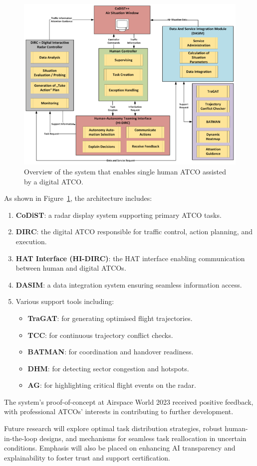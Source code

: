 \begin{figure}[!ht]
    \centering
    \includegraphics[width=.7\textwidth]{img/digital-atco.png}
    \caption{Overview of the system that enables single human ATCO assisted by a digital ATCO. \cite{Jameel_2023}}
    \label{digital-atco}
\end{figure}

As shown in Figure~\ref{digital-atco}, the architecture includes:
\begin{enumerate}
    \item \textbf{\gls{CoDiST}}: a radar display system supporting primary \gls{ATCO} tasks.
    \item \textbf{\gls{DIRC}}: the digital \gls{ATCO} responsible for traffic control, action planning, and execution.
    \item \textbf{\gls{HAT} Interface (HI-DIRC)}: the \gls{HAT} interface enabling communication between human and digital \glspl{ATCO}.
    \item \textbf{\gls{DASIM}}: a data integration system ensuring seamless information access.
    \item Various support tools including:
        \begin{itemize}
            \item \textbf{\gls{TraGAT}}: for generating optimised flight trajectories.
            \item \textbf{\gls{TCC}}: for continuous trajectory conflict checks.
            \item \textbf{\gls{BATMAN}}: for coordination and handover readiness.
            \item \textbf{\gls{DHM}}: for detecting sector congestion and hotspots.
            \item \textbf{\gls{AG}}: for highlighting critical flight events on the radar.
        \end{itemize}
\end{enumerate}

The system's proof-of-concept at Airspace World 2023 received positive feedback, with professional \glspl{ATCO}' interests in contributing to further development.

Future research will explore optimal task distribution strategies, robust human-in-the-loop designs, and mechanisms for seamless task reallocation in uncertain conditions.
Emphasis will also be placed on enhancing \gls{AI} transparency and explainability to foster trust and support certification.

